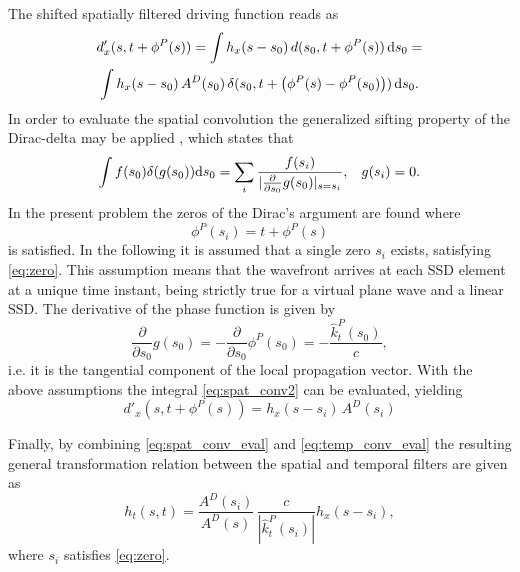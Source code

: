 \documentclass[conference]{IEEEtran}
\begin{document}
The shifted spatially filtered driving function reads as
\begin{multline}
    d'_x(s,t+ \phi^P(s) ) = \int h_x(s-s_0) \, d(s_0,t+ \phi^P(s) ) \, \td s_0 = \\
    \int h_x(s-s_0) \, A^D(s_0)\, \delta(s_0,t+ \left(\phi^P(s)-\phi^P(s_0)\right)  ) \, \td s_0.
    \label{eq:spat_conv2}
\end{multline}
In order to evaluate the spatial convolution the generalized sifting property of the Dirac-delta may be applied \cite{Firtha2019phd}, which states that
\begin{equation}
\int f(s_0) \delta(g(s_0)) \mathrm{d} s_0 = \sum_i \frac{f(s_i)}{| \frac{\partial}{\partial s_0} g(s_0) |_{s = s_i}}, \hspace{3mm} g(s_i) = 0.
\end{equation}
In the present problem the zeros of the Dirac's argument are found where         
\begin{equation}
    \phi^P(s_i) = t + \phi^P(s)
    \label{eq:zero}
\end{equation}
is satisfied.
In the following it is assumed that a single zero $s_i$ exists, satisfying \eqref{eq:zero}.
This assumption means that the wavefront arrives at each SSD element at a unique time instant, being strictly true for a virtual plane wave and a linear SSD.
The derivative of the phase function is given by
\begin{equation}
    \frac{\partial}{\partial s_0} g(s_0) = - \frac{\partial}{\partial s_0} \phi^P(s_0) = -\frac{\hat{k}_t^P(s_0)}{c},
\end{equation}
i.e. it is the tangential component of the local propagation vector.
With the above assumptions the integral \eqref{eq:spat_conv2} can be evaluated, yielding
\begin{equation}
    d'_x(s,t+ \phi^P(s) ) = h_x(s-s_i) \, A^D(s_i)
    \label{eq:spat_conv_eval}
\end{equation}

Finally, by combining \eqref{eq:spat_conv_eval} and \eqref{eq:temp_conv_eval} the resulting general transformation relation between the spatial and temporal filters are given as
\begin{equation}
    h_t\left(s,t\right) = \frac{A^D(s_i)}{A^D(s)} \, \frac{ c }{|\hat{k}_t^P(s_i)|} h_x(s-s_i),
\end{equation}
where $s_i$ satisfies \eqref{eq:zero}.
\end{document}
